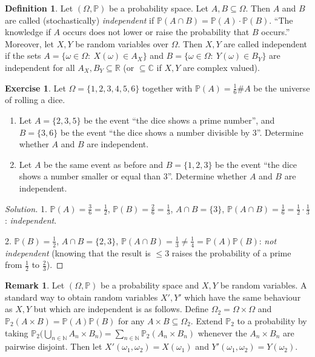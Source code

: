 \documentclass[11pt,a4paper]{article}
\numberwithin{equation}{section}
\newcommand{\N}{\mathbb{N}}
\newcommand{\R}{\mathbb{R}}
\newcommand{\C}{\mathbb{C}}
\newcommand{\PP}{\mathbb{P}}
\theoremstyle{plain}
\theoremstyle{definition}
\newtheorem{definition}[theorem]{Definition}
\newtheorem{exercise}[theorem]{Exercise}
\newtheorem{remark}[theorem]{Remark}
\theoremstyle{plain}
\theoremstyle{definition}
\newenvironment{solution}{\begin{proof}[Solution]}{\end{proof}}
\begin{document}
\begin{definition}
Let $(\Omega,\PP)$ be a probability space. Let $A,B\subseteq\Omega$. Then $A$ and $B$ are
called (stochastically) \emph{independent} if $\PP(A\cap B)=\PP(A)\cdot\PP(B)$. ``The
knowledge if $A$ occurs does not lower or raise the probability that $B$ occurs.'' Moreover,
let $X,Y$ be random variables over $\Omega$. Then $X,Y$ are called independent if the sets
$A=\{\omega\in\Omega:\ X(\omega)\in A_X\}$ and $B=\{\omega\in\Omega:\ Y(\omega)\in B_Y\}$ are
independent for all $A_X,B_Y\subseteq\R$ (or $\subseteq\C$ if $X,Y$ are complex valued).
\end{definition}

\begin{exercise}
Let $\Omega=\{1,2,3,4,5,6\}$ together with $\PP(A)=\frac16\#A$ be the universe of rolling a dice.
\begin{enumerate}
\item Let $A=\{2,3,5\}$ be the event ``the dice shows a prime number'', and $B=\{3,6\}$ be
the event ``the dice shows a number divisible by 3''. Determine whether $A$ and $B$ are independent.
\item Let $A$ be the same event as before and $B=\{1,2,3\}$ be the event ``the dice shows a
number smaller or equal than 3''. Determine whether $A$ and $B$ are independent.
\end{enumerate}
\end{exercise}
\begin{solution}
1. $\PP(A)=\frac36=\frac12$, $\PP(B)=\frac26=\frac13$, $A\cap B=\{3\}$,
$\PP(A\cap B)=\frac16=\frac12\cdot\frac13$: \emph{independent}.

2. $\PP(B)=\frac12$, $A\cap B=\{2,3\}$, $\PP(A\cap B)=\frac13\ne\frac14=\PP(A)\PP(B)$:
\emph{not independent} (knowing that the result is $\le3$ raises the probability of a
prime from $\frac12$ to $\frac23$).
\end{solution}

\begin{remark}\label{rem:product}
Let $(\Omega,\PP)$ be a probability space and $X,Y$ be random variables. A standard way to
obtain random variables $X',Y'$ which have the same behaviour as $X,Y$ but which are
independent is as follows. Define $\Omega_2=\Omega\times\Omega$ and
$\PP_2(A\times B)=\PP(A)\PP(B)$ for any $A\times B\subseteq\Omega_2$. Extend $\PP_2$ to a
probability by taking
$\PP_2\big(\bigcup_{n\in\N}A_n\times B_n\big)=\sum_{n\in\N}\PP_2(A_n\times B_n)$ whenever
the $A_n\times B_n$ are pairwise disjoint. Then let $X'(\omega_1,\omega_2)=X(\omega_1)$
and $Y'(\omega_1,\omega_2)=Y(\omega_2)$.
\end{remark}
\end{document}
